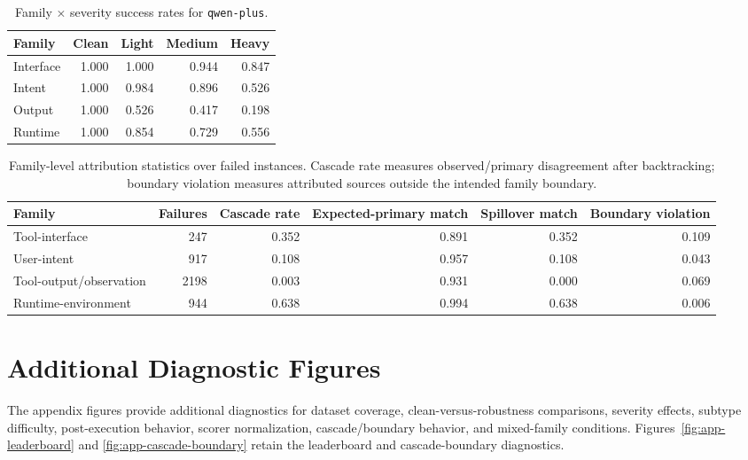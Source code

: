 \documentclass[11pt]{article}
\begin{document}
\begin{table}[htbp]
\centering
\small
\begin{tabular}{lrrrr}
\toprule
Family & Clean & Light & Medium & Heavy \\
\midrule
Interface & 1.000 & 1.000 & 0.944 & 0.847 \\
Intent & 1.000 & 0.984 & 0.896 & 0.526 \\
Output & 1.000 & 0.526 & 0.417 & 0.198 \\
Runtime & 1.000 & 0.854 & 0.729 & 0.556 \\
\bottomrule
\end{tabular}
\caption{Family $\times$ severity success rates for \texttt{qwen-plus}.}
\label{tab:qwen-severity}
\end{table}

\begin{table}[htbp]
\centering
\small
\begin{tabular}{lrrrrr}
\toprule
Family & Failures & Cascade rate & Expected-primary match & Spillover match & Boundary violation \\
\midrule
Tool-interface & 247 & 0.352 & 0.891 & 0.352 & 0.109 \\
User-intent & 917 & 0.108 & 0.957 & 0.108 & 0.043 \\
Tool-output/observation & 2198 & 0.003 & 0.931 & 0.000 & 0.069 \\
Runtime-environment & 944 & 0.638 & 0.994 & 0.638 & 0.006 \\
\bottomrule
\end{tabular}
\caption{Family-level attribution statistics over failed instances. Cascade rate measures observed/primary disagreement after backtracking; boundary violation measures attributed sources outside the intended family boundary.}
\label{tab:boundary-stats}
\end{table}

\FloatBarrier
\section{Additional Diagnostic Figures}
\label{app:figures}

The appendix figures provide additional diagnostics for dataset coverage, clean-versus-robustness comparisons, severity effects, subtype difficulty, post-execution behavior, scorer normalization, cascade/boundary behavior, and mixed-family conditions. Figures~\ref{fig:app-leaderboard} and \ref{fig:app-cascade-boundary} retain the leaderboard and cascade-boundary diagnostics.
\end{document}
